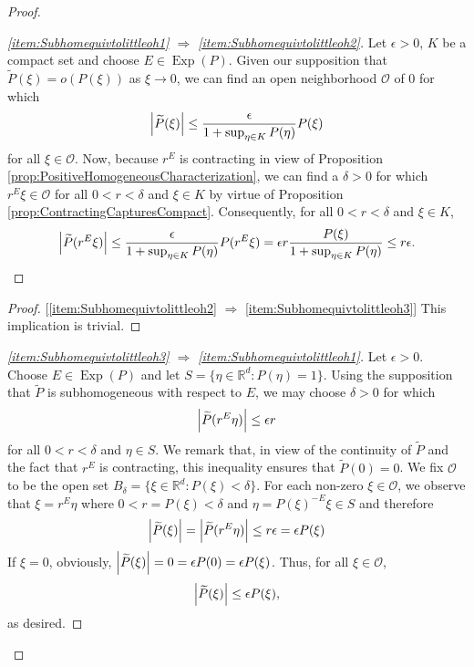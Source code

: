 \documentclass[11pt, letter]{book}
\newcommand*{\myproofname}{Proof}
\newenvironment{subproof}[1][\myproofname]{\begin{proof}[#1]\renewcommand*{\qedsymbol}{$\mathbin{/\mkern-6mu/}$}}{\end{proof}}
\newcommand\Exp{\operatorname{Exp}}
\begin{document}
\begin{proof}
\begin{subproof}[\ref{item:Subhomequivtolittleoh1} $\Rightarrow$ \ref{item:Subhomequivtolittleoh2}] Let $\epsilon>0$, $K$ be a compact set and choose $E\in \Exp(P)$. Given our supposition that $\widetilde{P}(\xi)=o(P(\xi))$ as $\xi\to 0$, we can find an open neighborhood $\mathcal{O}$ of $0$ for which 
\begin{equation*}
\abs{\widetilde{P}(\xi)}\leq \frac{\epsilon}{1+\sup_{\eta\in K}P(\eta)}P(\xi)
\end{equation*}
for all $\xi\in \mathcal{O}$. Now, because $r^E$ is contracting in view of Proposition \ref{prop:PositiveHomogeneousCharacterization}, we can find a $\delta>0$ for which $r^E\xi\in \mathcal{O}$ for all $0<r<\delta$ and $\xi\in K$ by virtue of Proposition \ref{prop:ContractingCapturesCompact}. Consequently, for all $0<r<\delta$ and $\xi\in K$,
\begin{equation*}
\abs{\widetilde{P}(r^E\xi)}\leq \frac{\epsilon}{1+\sup_{\eta\in K}P(\eta)}P(r^E\xi)=\epsilon r\frac{P(\xi)}{1+\sup_{\eta\in K}P(\eta)}\leq r\epsilon.
\end{equation*}
\end{subproof}

\begin{subproof} [\ref{item:Subhomequivtolittleoh2} $\Rightarrow$ \ref{item:Subhomequivtolittleoh3}] This implication is trivial.
\end{subproof}
 
\begin{subproof}[\ref{item:Subhomequivtolittleoh3} $\Rightarrow$ \ref{item:Subhomequivtolittleoh1}]  Let $\epsilon>0$. Choose $E\in \Exp(P)$ and let $S=\{\eta\in\mathbb{R}^d:P(\eta)=1\}$. Using the supposition that $\widetilde{P}$ is subhomogeneous with respect to $E$, we may choose $\delta>0$ for which
\begin{equation*}
\abs{\widetilde{P}(r^E\eta)}\leq \epsilon r 
\end{equation*}
for all $0<r<\delta$ and $\eta\in S$. We remark that, in view of the continuity of $\widetilde{P}$ and the fact that $r^E$ is contracting, this inequality ensures that $\widetilde{P}(0)=0$. We fix $\mathcal{O}$ to be the open set $B_\delta=\{\xi\in\mathbb{R}^d:P(\xi)<\delta\}$. For each non-zero $\xi\in\mathcal{O}$, we observe that $\xi=r^E\eta$ where $0<r=P(\xi)<\delta$ and $\eta=P(\xi)^{-E}\xi\in S$ and therefore
\begin{equation*}
\abs{\widetilde{P}(\xi)}=\abs{\widetilde{P}(r^E\eta)}\leq r\epsilon=\epsilon  P(\xi)
\end{equation*}
If $\xi=0$, obviously, $\abs{\widetilde{P}(\xi)}=0=\epsilon P(0)=\epsilon P(\xi)$. Thus, for all $\xi\in\mathcal{O}$,
\begin{equation*}
\abs{\widetilde{P}(\xi)}\leq\epsilon P(\xi),
\end{equation*}
as desired.
\end{subproof}
\end{proof}
\end{document}
